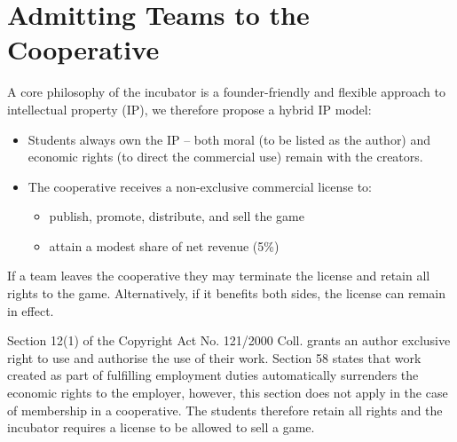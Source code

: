 \section{Admitting Teams to the Cooperative}
A core philosophy of the incubator is a founder-friendly and flexible approach to intellectual property (IP), we therefore propose a hybrid IP model:
\begin{itemize}
    \item Students always own the IP – both moral (to be listed as the author) and economic rights (to direct the commercial use) remain with the creators.
    \item The cooperative receives a non-exclusive commercial license to:
    \begin{itemize}
        \item publish, promote, distribute, and sell the game
        \item attain a modest share of net revenue (5\%)
    \end{itemize}
\end{itemize}
If a team leaves the cooperative they may terminate the license and retain all rights to the game. Alternatively, if it benefits both sides, the license can remain in effect. 

Section 12(1) of the Copyright Act No. 121/2000 Coll. grants an author exclusive right to use and authorise the use of their work. Section 58 states that work created as part of fulfilling employment duties automatically surrenders the economic rights to the employer, however, this section does not apply in the case of membership in a cooperative. The students therefore retain all rights and the incubator requires a license to be allowed to sell a game.

